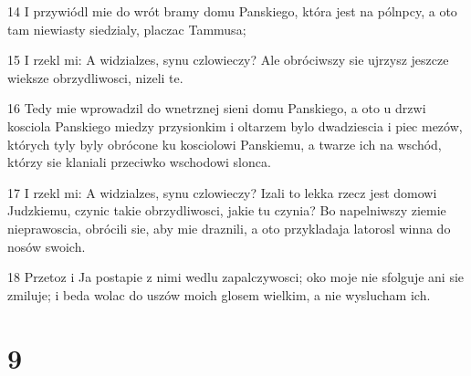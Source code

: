 \par 14 I przywiódl mie do wrót bramy domu Panskiego, która jest na pólnpcy, a oto tam niewiasty siedzialy, placzac Tammusa;
\par 15 I rzekl mi: A widzialzes, synu czlowieczy? Ale obróciwszy sie ujrzysz jeszcze wieksze obrzydliwosci, nizeli te.
\par 16 Tedy mie wprowadzil do wnetrznej sieni domu Panskiego, a oto u drzwi kosciola Panskiego miedzy przysionkim i oltarzem bylo dwadziescia i piec mezów, których tyly byly obrócone ku kosciolowi Panskiemu, a twarze ich na wschód, którzy sie klaniali przeciwko wschodowi slonca.
\par 17 I rzekl mi: A widzialzes, synu czlowieczy? Izali to lekka rzecz jest domowi Judzkiemu, czynic takie obrzydliwosci, jakie tu czynia? Bo napelniwszy ziemie nieprawoscia, obrócili sie, aby mie draznili, a oto przykladaja latorosl winna do nosów swoich.
\par 18 Przetoz i Ja postapie z nimi wedlu zapalczywosci; oko moje nie sfolguje ani sie zmiluje; i beda wolac do uszów moich glosem wielkim, a nie wyslucham ich.

\chapter{9}

